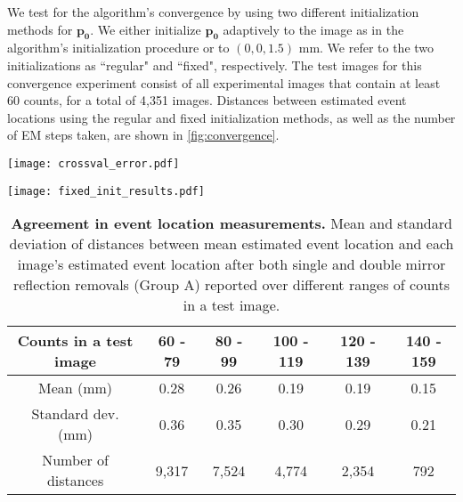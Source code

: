 We test for the algorithm's convergence by using two different initialization 
methods for $\bm{p_0}$. 
We either initialize $\bm{p_0}$ adaptively to the image as in the algorithm's 
initialization procedure or to $(0,0,1.5)$ mm.
We refer to the two initializations as ``regular" and ``fixed", respectively.
The test images for this convergence experiment consist of all experimental images 
that contain at least 60 counts, for a total of 4,351 images.
Distances between estimated event locations using the regular and fixed 
initialization methods, as well as the number of EM steps taken, are shown in \cref{fig:convergence}.

\begin{figure*}
\centering
\texttt{[image: crossval\_error.pdf]}
\caption{\textbf{Agreement in event location measurements.} Histogram of distances between mean estimated event location and each image's estimated event location after mirror reflection removals. 
(a) Distances including both single and double mirror reflection removals (Group A). Mean $\pm$ stdev: 0.24 $\pm$ 0.34 mm, 24,761 distances.
(b) Distances including single mirror reflection removal (Group B). Mean $\pm$ stdev: 0.16 $\pm$ 0.28 mm, 11,255 distances.
(c) Distances including double mirror reflection removal (Group C). Mean $\pm$ stdev: 0.27 $\pm$ 0.35 mm, 15,757 distances.
} 
\label{fig:crossval_error}
\end{figure*}

\begin{figure*}
\centering
\texttt{[image: fixed\_init\_results.pdf]}
\caption{\textbf{Optimization convergence.}
(a) Distances in estimated event locations between the regular and fixed initialization methods. Mean $\pm$ stdev: $0.38 \pm 0.80$ mm, 4,351 events.
(b) Number of steps taken in the EM algorithm from the regular initialization point. Mean $\pm$ stdev: $9.3 \pm 14.2$ steps, 4,351 events.
(c) Number of steps taken in the EM algorithm from the fixed initialization point. Mean $\pm$ stdev: $13.5 \pm 14.9$ steps, 4,351 events.
} 
\label{fig:convergence}
\end{figure*}



\begin{table}[h!]
\centering
\begin{tabular}{|c|ccccc|}
\hline
Counts in a test image & 60 - 79 & 80 - 99 & 100 - 119 & 120 - 139 & 140 - 159 \\
\hline
Mean (mm)                & 0.28 & 0.26 & 0.19 & 0.19 & 0.15 \\
Standard dev.  (mm)      & 0.36 & 0.35 & 0.30 & 0.29 & 0.21  \\
Number of distances    & 9,317  & 7,524  & 4,774  & 2,354  & 792 \\
\hline
\end{tabular}
\caption{\textbf{Agreement in event location measurements.} Mean and standard 
deviation of distances between mean estimated event location and each image's 
estimated event location after both single and double mirror reflection removals 
(Group A) reported over different ranges of counts in a test image.}
\label{tab:crossval_thresh_error}
\end{table}



